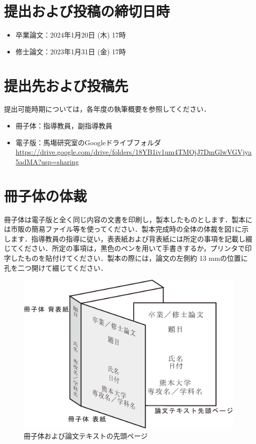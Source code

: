 \documentclass[12pt]{kupaper}
\begin{document}
\chapter{提出および投稿の締切日時}
\begin{itemize}
	\item 卒業論文：2024年1月20日 (木) 17時
	\item 修士論文：2023年1月31日 (金) 17時
\end{itemize}

\chapter{提出先および投稿先}
提出可能時期については，各年度の執筆概要を参照してください．
\begin{itemize}
	\item 冊子体：指導教員，副指導教員
	\item 電子版：馬塲研究室のGoogleドライブフォルダ \url{https://drive.google.com/drive/folders/18YB1iv1um4TMOjJ7DmGlwVGVjya5adMA?usp=sharing}
\end{itemize}

\chapter{冊子体の体裁}

冊子体は電子版と全く同じ内容の文書を印刷し，製本したものとします．製本には市販の簡易ファイル等を使ってください．製本完成時の全体の体裁を図1に示します．指導教員の指導に従い，表表紙および背表紙には所定の事項を記載し綴じてください．所定の事項は，黒色のペンを用いて手書きするか，プリンタで印字したものを貼付けてください．製本の際には，論文の左側約 13 mmの位置に孔を二つ開けて綴じてください．

\begin{figure}[htbp]
	\centering
	\includegraphics[width=1.0\linewidth,keepaspectratio]{book.eps}
	\caption{冊子体および論文テキストの先頭ページ}
	\label{overview}
\end{figure}
\end{document}
